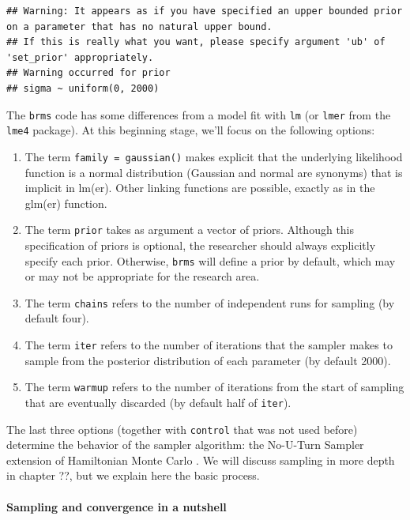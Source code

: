 \documentclass[12pt,]{krantz}
\providecommand{\tightlist}{%
  \setlength{\itemsep}{0pt}\setlength{\parskip}{0pt}}
\let\oldparagraph\paragraph
\renewcommand{\paragraph}[1]{\oldparagraph{#1}\mbox{}}
\theoremstyle{definition}
\theoremstyle{definition}
\theoremstyle{definition}
\theoremstyle{remark}
\begin{document}
\begin{verbatim}
## Warning: It appears as if you have specified an upper bounded prior on a parameter that has no natural upper bound.
## If this is really what you want, please specify argument 'ub' of 'set_prior' appropriately.
## Warning occurred for prior 
## sigma ~ uniform(0, 2000)
\end{verbatim}

The \texttt{brms} code has some differences from a model fit with
\texttt{lm} (or \texttt{lmer} from the \texttt{lme4} package). At this
beginning stage, we'll focus on the following options:

\begin{enumerate}
\def\labelenumi{\arabic{enumi}.}
\tightlist
\item
  The term \texttt{family\ =\ gaussian()} makes explicit that the
  underlying likelihood function is a normal distribution (Gaussian and
  normal are synonyms) that is implicit in lm(er). Other linking
  functions are possible, exactly as in the glm(er) function.
\item
  The term \texttt{prior} takes as argument a vector of priors. Although
  this specification of priors is optional, the researcher should always
  explicitly specify each prior. Otherwise, \texttt{brms} will define a
  prior by default, which may or may not be appropriate for the research
  area.
\item
  The term \texttt{chains} refers to the number of independent runs for
  sampling (by default four).
\item
  The term \texttt{iter} refers to the number of iterations that the
  sampler makes to sample from the posterior distribution of each
  parameter (by default 2000).
\item
  The term \texttt{warmup} refers to the number of iterations from the
  start of sampling that are eventually discarded (by default half of
  \texttt{iter}).
\end{enumerate}

The last three options (together with \texttt{control} that was not used
before) determine the behavior of the sampler algorithm: the No-U-Turn
Sampler \citep[NUTS;][]{hoffmanNoUTurnSamplerAdaptively2014} extension
of Hamiltonian Monte Carlo
\citep{duaneHybridMonteCarlo1987, nealMCMCUsingHamiltonian2011}. We will
discuss sampling in more depth in chapter ??, but we explain here the
basic process.

\paragraph{Sampling and convergence in a
nutshell}\label{sec:convergencenut}
\end{document}

